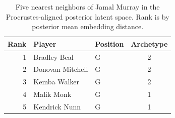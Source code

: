 \begin{table}[htbp]
  \centering\small
  \begin{tabular}{rllc}
    \toprule
    Rank & Player & Position & Archetype \\
    \midrule
    1 & Bradley Beal & G & 2 \\
    2 & Donovan Mitchell & G & 2 \\
    3 & Kemba Walker & G & 2 \\
    4 & Malik Monk & G & 1 \\
    5 & Kendrick Nunn & G & 1 \\
    \bottomrule
  \end{tabular}
  \caption{Five nearest neighbors of Jamal Murray in the Procrustes-aligned posterior latent space. Rank is by posterior mean embedding distance.}
  \label{tab:Jamal_Murray_neighbors}
\end{table}

